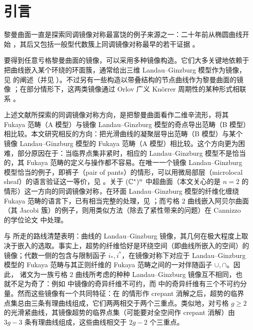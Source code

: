 \begin{abstract}
按通常的表述，亏格 $g\ge 2$ 的曲线的镜像是一个 Landau--Ginzburg 模型；但超势的临界点集才是真正要紧的对象。本文由此出发，对曲线构造一个 A 模型：其对象是三价有理曲线构形，并在节点处带有附加数据。我们为这类三价图定义拉格朗日 Floer 理论与 Fukaya 范畴，并证明它与相应的非阿基米德广义 Tate 曲线的导出范畴等价；随后给出 theta 函数与典范映射的显式对应。
\end{abstract}

\section{引言}\label{s:intro}

黎曼曲面一直是探索同调镜像对称最富饶的例子来源之一：二十年前从椭圆曲线开始 \cite{PZ}，其后又包括一般型代数簇上同调镜像对称最早的若干证据 \cite{SeGenus2,EfimovGenusG,AAEKO}。

要得到任意亏格黎曼曲面的镜像，可以采用多种镜像构造。它们大多关键地依赖于把曲线嵌入某个环绕的环面簇，通常给出三维 Landau--Ginzburg 模型作为镜像，见 \cite{AAK} 的阐述（并见 \cite{HoriVafa,Clarke,ChanLauLeung,GKR}）。不过另有一些构造以带叠结构的节点曲线作为黎曼曲面的镜像 \cite{STZ,GammageShende,LekiliPolishchuk}；在部分情形下，这两类镜像通过 Orlov 广义 Kn\"orrer 周期性的某种形式相联系 \cite{Orlov}。

上述文献所探索的同调镜像对称方向，是把黎曼曲面看作二维辛流形，将其 Fukaya 范畴（A 模型）与镜像 Landau--Ginzburg 模型的奇点导出范畴（B 模型）相比较。本文研究相反的方向：把光滑曲线的凝聚层导出范畴（B 模型）与某个镜像 Landau--Ginzburg 模型的 Fukaya 范畴（A 模型）相比较。这个方向更为困难，部分原因在于：当临界点集非紧时，相应的 Landau--Ginzburg 模型不是恰当的，其 Fukaya 范畴的定义与操作都不容易。在唯一一个镜像 Landau--Ginzburg 模型恰当的例子，即裤子（pair of pants）的情形，可以用微局部层（microlocal sheaf）的语言验证这一等价，见 \cite{Nadler}。关于 $(\mathbb{C}^*)^n$ 中超曲面（本文关心的是 $n=2$ 的情形）这一方向的同调镜像对称，在环面 Landau--Ginzburg 模型的纤维化缠绕 Fukaya 范畴的语言下，已有相当完整的处理，见 \cite{AA}；而亏格 $2$ 曲线嵌入阿贝尔曲面（其 Jacobi 簇）的例子，则用类似方法（除去了紧性带来的问题）在 Cannizzo 的学位论文 \cite{Cannizzo} 中处理。

\cite{AA} 与 \cite{Cannizzo} 所走的路线清楚表明：曲线的 Landau--Ginzburg 镜像，其几何在极大程度上取决于嵌入的选取。事实上，超势的纤维恰好是环绕空间（即曲线所嵌入的空间）的镜像；代数一侧的包含与限制函子 $i_*,i^*$，在镜像对称下对应于 Landau--Ginzburg 模型的 Fukaya 范畴与其正则纤维的 Fukaya 范畴之间的一对伴随函子 $\cup,\cap$。因此，\cite{SeGenus2,GKR,AAK,Cannizzo} 诸文为一族亏格 $2$ 曲线所考虑的种种 Landau--Ginzburg 镜像互不相同，也就不足为奇了：例如 \cite{Cannizzo} 中镜像的奇异纤维不可约，而 \cite{GKR,AAK} 中的奇异纤维有三个不可约分量。然而这些镜像有一个共同特征：在 \cite{SeGenus2} 的情形作 crepant 消解之后，超势的临界点集总由三条有理曲线组成，它们两两相交于两个三重点。类似地，对亏格 $g\ge 2$ 的光滑紧曲线，其镜像超势的临界点集（可能要对全空间作 crepant 消解）由 $3g-3$ 条有理曲线组成，这些曲线相交于 $2g-2$ 个三重点。

